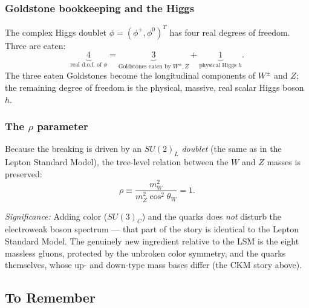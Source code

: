 \subsubsection*{Goldstone bookkeeping and the Higgs}

The complex Higgs doublet $\phi=(\phi^+,\phi^0)^T$ has four real
degrees of freedom. Three are eaten:
\begin{equation}
  \underbrace{4}_{\text{real d.o.f.\ of }\phi}
  = \underbrace{3}_{\text{Goldstones eaten by }W^\pm,Z}
  + \underbrace{1}_{\text{physical Higgs }h}.
  \label{eq:lec20:goldstone-count}
\end{equation}
The three eaten Goldstones become the longitudinal components of
$W^\pm$ and $Z$; the remaining degree of freedom is the physical,
massive, real scalar Higgs boson $h$.

\subsubsection*{The $\rho$ parameter}

Because the breaking is driven by an $SU(2)_L$ \emph{doublet} (the same
as in the Lepton Standard Model), the tree-level relation between the
$W$ and $Z$ masses is preserved:
\begin{equation}
  \boxed{
    \rho \equiv \frac{m_W^2}{m_Z^2\cos^2\theta_W} = 1 .
  }
  \label{eq:lec20:rho}
\end{equation}

\textit{Significance:} Adding color ($SU(3)_C$) and the quarks does
\emph{not} disturb the electroweak boson spectrum --- that part of the
story is identical to the Lepton Standard Model. The genuinely new
ingredient relative to the LSM is the eight massless gluons, protected
by the unbroken color symmetry, and the quarks themselves, whose up-
and down-type mass bases differ (the CKM story above).

\subsection*{To Remember}

